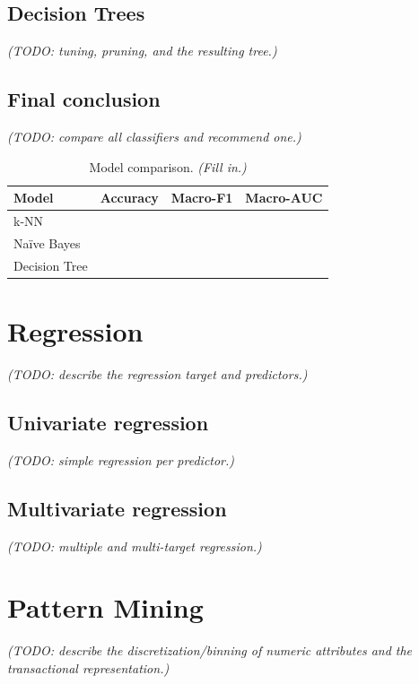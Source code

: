\documentclass[11pt,a4paper]{article}
\numberwithin{table}{section}
\numberwithin{figure}{section}
\begin{document}
\subsection{Decision Trees}
\emph{(TODO: tuning, pruning, and the resulting tree.)}

\subsection{Final conclusion}
\emph{(TODO: compare all classifiers and recommend one.)}

\begin{table}[h]
  \centering
  \caption{Model comparison. \emph{(Fill in.)}}
  \label{tab:clf-results}
  \footnotesize
  \setlength{\tabcolsep}{3pt}
  \begin{tabular}{lccc}
    \toprule
    Model & Accuracy & Macro-F1 & Macro-AUC \\
    \midrule
    k-NN & & & \\
    Na\"ive Bayes & & & \\
    Decision Tree & & & \\
    \bottomrule
  \end{tabular}
\end{table}

\section{Regression}
\label{sec:regression}
\emph{(TODO: describe the regression target and predictors.)}

\subsection{Univariate regression}
\emph{(TODO: simple regression per predictor.)}

\subsection{Multivariate regression}
\emph{(TODO: multiple and multi-target regression.)}

\section{Pattern Mining}
\label{sec:patterns}
\emph{(TODO: describe the discretization/binning of numeric attributes and the
transactional representation.)}
\end{document}
